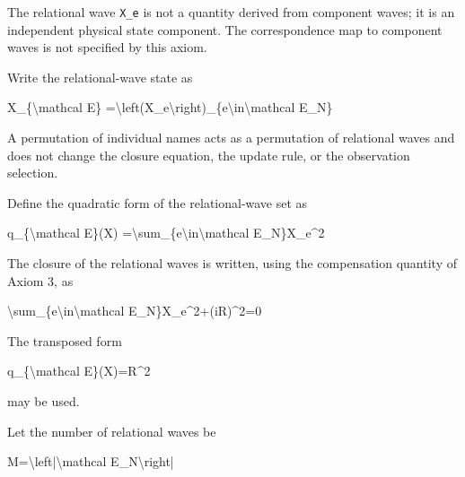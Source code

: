 \documentclass[
  a4paper,
]{article}
\newenvironment{Shaded}{}{}
\newcommand{\NormalTok}[1]{#1}
\begin{document}
The relational wave \texttt{X\_e} is not a quantity derived from
component waves; it is an independent physical state component. The
correspondence map to component waves is not specified by this axiom.

Write the relational-wave state as

\begin{Shaded}
\begin{Highlighting}[]
\NormalTok{X\_\{\textbackslash{}mathcal E\}}
\NormalTok{=\textbackslash{}left(X\_e\textbackslash{}right)\_\{e\textbackslash{}in\textbackslash{}mathcal E\_N\}}
\end{Highlighting}
\end{Shaded}

A permutation of individual names acts as a permutation of relational
waves and does not change the closure equation, the update rule, or the
observation selection.

Define the quadratic form of the relational-wave set as

\begin{Shaded}
\begin{Highlighting}[]
\NormalTok{q\_\{\textbackslash{}mathcal E\}(X)}
\NormalTok{=\textbackslash{}sum\_\{e\textbackslash{}in\textbackslash{}mathcal E\_N\}X\_e\^{}2}
\end{Highlighting}
\end{Shaded}

The closure of the relational waves is written, using the compensation
quantity of Axiom 3, as

\begin{Shaded}
\begin{Highlighting}[]
\NormalTok{\textbackslash{}sum\_\{e\textbackslash{}in\textbackslash{}mathcal E\_N\}X\_e\^{}2+(iR)\^{}2=0}
\end{Highlighting}
\end{Shaded}

The transposed form

\begin{Shaded}
\begin{Highlighting}[]
\NormalTok{q\_\{\textbackslash{}mathcal E\}(X)=R\^{}2}
\end{Highlighting}
\end{Shaded}

may be used.

Let the number of relational waves be

\begin{Shaded}
\begin{Highlighting}[]
\NormalTok{M=\textbackslash{}left|\textbackslash{}mathcal E\_N\textbackslash{}right|}
\end{Highlighting}
\end{Shaded}
\end{document}
